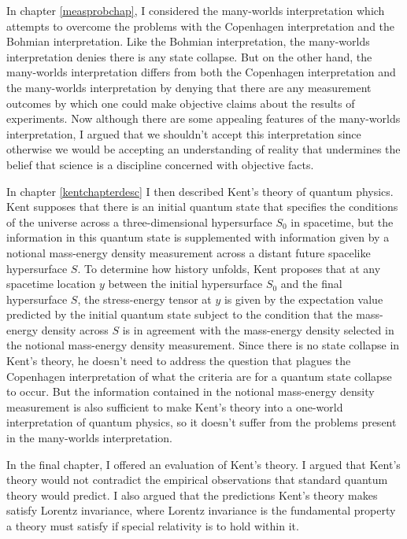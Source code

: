 \documentclass[12pt]{report}
\begin{document}
In chapter \ref{measprobchap}, I considered the many-worlds interpretation which attempts to overcome the problems with the Copenhagen interpretation and the Bohmian interpretation. Like the Bohmian interpretation, the many-worlds interpretation denies there is any state collapse. But on the other hand, the many-worlds interpretation differs from both the Copenhagen interpretation and the many-worlds interpretation by denying that there are any measurement outcomes by which one could make objective claims about the results of experiments. Now although there are some appealing features of the many-worlds interpretation, I argued that we shouldn't accept this interpretation since otherwise we would be accepting an understanding of reality that undermines the belief that science is a discipline concerned with objective facts. 

In chapter \ref{kentchapterdesc} I then described Kent's theory of quantum physics. Kent supposes that there is an initial quantum state that specifies the conditions of the universe across a three-dimensional hypersurface $S_0$ in spacetime, but the information in this quantum state is supplemented with information given by a notional mass-energy density measurement across a distant future spacelike hypersurface $S$. To determine how history unfolds, Kent proposes that at any spacetime location $y$ between the initial hypersurface $S_0$ and the final hypersurface $S$, the stress-energy tensor at $y$ is given by the expectation value predicted by the initial quantum state subject to the condition that the mass-energy density across $S$ is in agreement with the mass-energy density selected in the notional mass-energy density measurement. Since there is no state collapse in Kent's theory, he doesn't need to address the question that plagues the Copenhagen interpretation of what the criteria are for a quantum state collapse to occur. But the information contained in the notional mass-energy density measurement is also sufficient to make Kent's theory into a one-world interpretation of quantum physics, so it doesn't suffer from the problems present in the many-worlds interpretation. 

In the final chapter, I offered an evaluation of Kent's theory. I argued that Kent's theory would not contradict the empirical observations that standard quantum theory would predict. I also argued that the predictions Kent's theory makes satisfy Lorentz invariance, where Lorentz invariance is the fundamental property a theory must satisfy if special relativity is to hold within it. 
\end{document}
